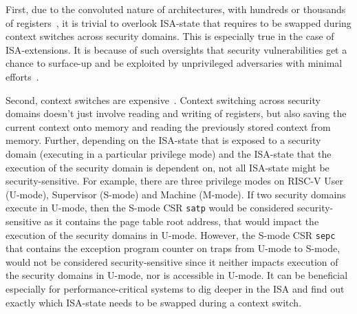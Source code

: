 First, due to the convoluted nature of architectures, with hundreds or thousands of registers~\cite{riscv-isa, arm-ref-manual}, it is trivial to overlook ISA-state that requires to be swapped during context switches across security domains. 
This is especially true in the case of ISA-extensions. 
It is because of such oversights that security vulnerabilities get a chance to surface-up and be exploited by unprivileged adversaries with minimal efforts~\cite{dtrap-fpu, totw}. 

Second, context switches are expensive~\cite{context-switch-cost, context-switch-cost-hotos}.
Context switching across security domains doesn't just involve reading and writing of registers, but also saving the current context onto memory and reading the previously stored context from memory. 
Further, depending on the ISA-state that is exposed to a security domain (executing in a particular privilege mode) and the ISA-state that the execution of the security domain is dependent on, not all ISA-state might be security-sensitive. 
For example, there are three privilege modes on RISC-V \ie{} User (U-mode), Supervisor (S-mode) and Machine (M-mode).
If two security domains execute in U-mode, then the S-mode CSR \texttt{satp} would be considered security-sensitive as it contains the page table root address, that would impact the execution of the security domains in U-mode. 
However, the S-mode CSR \texttt{sepc} that contains the exception program counter on traps from U-mode to S-mode, would not be considered security-sensitive since it neither impacts execution of the security domains in U-mode, nor is accessible in U-mode.  
It can be beneficial especially for performance-critical systems to dig deeper in the ISA and find out exactly which ISA-state needs to be swapped during a context switch. 


